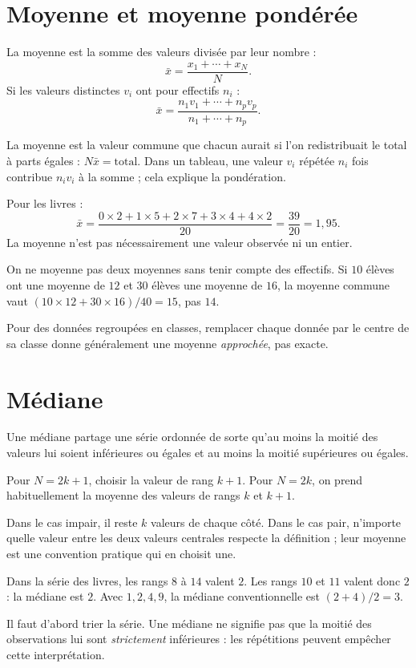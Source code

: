 \documentclass[../cours_3e.tex]{subfiles}
\begin{document}
\section{Moyenne et moyenne pondérée}
\begin{definition}
La moyenne est la somme des valeurs divisée par leur nombre :
\[\bar x=\frac{x_1+\cdots+x_N}{N}.
\]
Si les valeurs distinctes $v_i$ ont pour effectifs $n_i$ :
\[\bar x=\frac{n_1v_1+\cdots+n_pv_p}{n_1+\cdots+n_p}.\]
\end{definition}
\begin{justification}
La moyenne est la valeur commune que chacun aurait si l'on redistribuait le total à parts égales : $N\bar x=\text{total}$. Dans un tableau, une valeur $v_i$ répétée $n_i$ fois contribue $n_iv_i$ à la somme ; cela explique la pondération.
\end{justification}
Pour les livres :
\[\bar x=\frac{0\times2+1\times5+2\times7+3\times4+4\times2}{20}
=\frac{39}{20}=1{,}95.\]
La moyenne n'est pas nécessairement une valeur observée ni un entier.
\begin{attention}
On ne moyenne pas deux moyennes sans tenir compte des effectifs. Si $10$ élèves ont une moyenne de $12$ et $30$ élèves une moyenne de $16$, la moyenne commune vaut $(10\times12+30\times16)/40=15$, pas $14$.
\end{attention}
Pour des données regroupées en classes, remplacer chaque donnée par le centre de sa classe donne généralement une moyenne \emph{approchée}, pas exacte.
\section{Médiane}
\begin{definition}
Une médiane partage une série ordonnée de sorte qu'au moins la moitié des valeurs lui soient inférieures ou égales et au moins la moitié supérieures ou égales.
\end{definition}
Pour $N=2k+1$, choisir la valeur de rang $k+1$. Pour $N=2k$, on prend habituellement la moyenne des valeurs de rangs $k$ et $k+1$.
\begin{justification}
Dans le cas impair, il reste $k$ valeurs de chaque côté. Dans le cas pair, n'importe quelle valeur entre les deux valeurs centrales respecte la définition ; leur moyenne est une convention pratique qui en choisit une.
\end{justification}
Dans la série des livres, les rangs $8$ à $14$ valent $2$. Les rangs $10$ et $11$ valent donc $2$ : la médiane est $2$. Avec $1,2,4,9$, la médiane conventionnelle est $(2+4)/2=3$.
\begin{attention}
Il faut d'abord trier la série. Une médiane ne signifie pas que la moitié des observations lui sont \emph{strictement} inférieures : les répétitions peuvent empêcher cette interprétation.
\end{attention}
\clearpage
\end{document}
